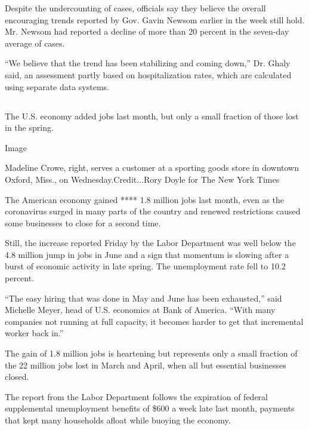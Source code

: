 Despite the undercounting of cases, officials say they believe the
overall encouraging trends reported by Gov. Gavin Newsom earlier in the
week still hold. Mr. Newsom had reported a decline of more than 20
percent in the seven-day average of cases.

``We believe that the trend has been stabilizing and coming down,'' Dr.
Ghaly said, an assessment partly based on hospitalization rates, which
are calculated using separate data systems.

\hypertarget{section-3}{%
\subsection{}\label{section-3}}

The U.S. economy added jobs last month, but only a small fraction of
those lost in the spring.

Image

Madeline Crowe, right, serves a customer at a sporting goods store in
downtown Oxford, Miss., on Wednesday.Credit...Rory Doyle for The New
York Times

The American economy gained **** 1.8 million jobs last month, even as
the coronavirus surged in many parts of the country and renewed
restrictions caused some businesses to close for a second time.

Still, the increase reported Friday by the Labor Department was well
below the 4.8 million jump in jobs in June and a sign that momentum is
slowing after a burst of economic activity in late spring. The
unemployment rate fell to 10.2 percent.

``The easy hiring that was done in May and June has been exhausted,''
said Michelle Meyer, head of U.S. economics at Bank of America. ``With
many companies not running at full capacity, it becomes harder to get
that incremental worker back in.''

The gain of 1.8 million jobs is heartening but represents only a small
fraction of the 22 million jobs lost in March and April, when all but
essential businesses closed.

The report from the Labor Department follows the expiration of federal
supplemental unemployment benefits of \$600 a week late last month,
payments that kept many households afloat while buoying the economy.

\hypertarget{section-4}{%
\subsection{}\label{section-4}}

